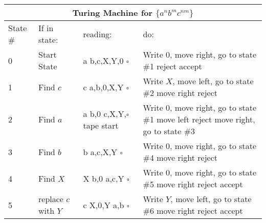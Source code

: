 \documentclass[10pt,letterpaper]{article}
\begin{document}
\begin{center}
	\begin{tabular}{ | p{1.5cm} | p{3.5cm} | p{2cm} | p{8cm} | }
		\hline
		\multicolumn{4}{|c|}{Turing Machine for $\{a^nb^mc^{nm}\}$} \\
		\hline
		State \# & If in state: & reading: & do: \\ \hline
		0 & Start State & a \newline b,c,X,Y,0 \newline $\square$ 
			& Write $0$, move right, go to state \#1 \newline reject
			\newline accept\\ \hline

		1 & Find $c$ & c \newline a,b,0,X,Y \newline $\square$ & Write $X$, move left,
			go to state \#2  \newline move right \newline reject\\ \hline

		2 & Find $a$ & a \newline b,0 \newline c,X,Y,$\square$ \newline tape start
			& Write $0$, move right, go to state \#1 \newline move left \newline
			reject \newline move right, go to state \#3 \\ \hline

		3 & Find $b$ & b \newline 0 \newline a,c,X,Y $\square$ & Write $0$, move right,
			go to state \#4 \newline move right \newline reject \\ \hline

		4 & Find $X$ & X \newline b,0 \newline a,c,Y \newline $\square$ & 
			Write $0$, move right, go to state \#5 \newline move right
			\newline reject \newline accept \\ \hline

		5 & replace $c$ with $Y$ & c \newline X,0,Y \newline a,b \newline $\square$ 
			& Write $Y$, move left, go to state \#6 \newline move right
			\newline reject \newline accept	\\ \hline 


\end{tabular}
\end{center}
\end{document}
